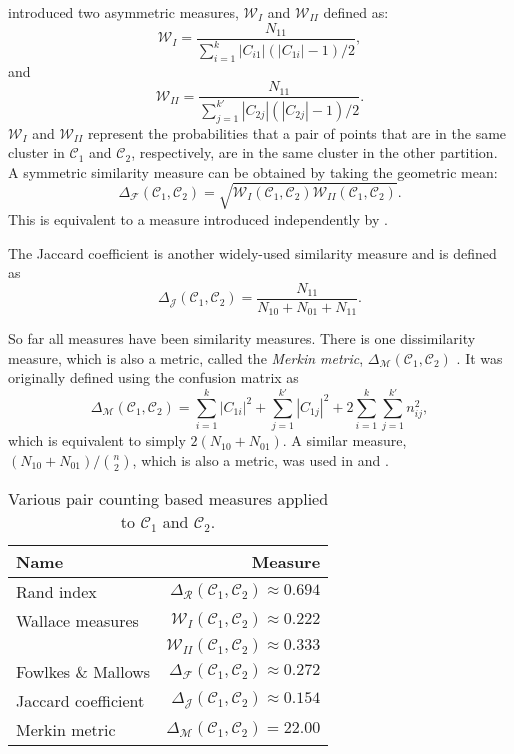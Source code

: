 \documentclass[a4paper]{report}
\newcommand{\clus}{\mathcal{C}}
\newcommand{\partcompare}[1]{\Delta_{\mathcal{#1}}(\clus_1,\clus_2)}
\begin{document}
\citet{wallace-1983} introduced two asymmetric measures, $\mathcal{W}_{I}$ and
$\mathcal{W}_{II}$ defined as:
\begin{equation*}
  \mathcal{W}_{I} = \frac{N_{11}}{\sum_{i=1}^{k} |C_{i1}|(|C_{1i}|-1)/2},
\end{equation*}
and
\begin{equation*}
  \mathcal{W}_{II} = \frac{N_{11}}{\sum_{j=1}^{k'} |C_{2j}|(|C_{2j}|-1)/2}.
\end{equation*}
$\mathcal{W}_{I}$ and $\mathcal{W}_{II}$ represent the probabilities that a
pair of points that are in the same cluster in $\clus_1$ and $\clus_2$,
respectively, are in the same cluster in the other partition.  A symmetric
similarity measure can be obtained by taking the geometric mean:
\begin{equation*}
  \partcompare{F} = \sqrt{\mathcal{W}_{I}(\clus_1,\clus_2)
                          \mathcal{W}_{II}(\clus_1,\clus_2)}.
\end{equation*}
This is equivalent to a measure introduced independently by
\citet{fowlkes-mallows-1983}.

The Jaccard coefficient is another widely-used similarity measure and is
defined as
\begin{equation*}
  \partcompare{J} = \frac{N_{11}}{N_{10}+N_{01}+N_{11}}.
\end{equation*}

So far all measures have been similarity measures.  There is one dissimilarity
measure, which is also a metric, called the \textit{Merkin metric},
$\partcompare{M}$ \citep{mirkin1996mathematical}.  It was originally defined
using the confusion matrix as
\begin{equation*}
  \partcompare{M} = \sum_{i=1}^{k} |C_{1i}|^2 +
                    \sum_{j=1}^{k'} |C_{1j}|^2 +
                    2\sum_{i=1}^{k}\sum_{j=1}^{k'} n_{ij}^2,
\end{equation*}
which is equivalent to simply $2(N_{10}+N_{01})$.  A similar measure,
$(N_{10}+N_{01})/\binom{n}{2}$, which is also a metric, was used in
\citet{mirkin1970measurement} and \citet{arabie1973multidimensional}.

\begin{table}
  \centering
  \begin{tabular}{lr}
    \toprule
    Name & Measure \\
    \midrule
    Rand index          & $\partcompare{R} \approx 0.694$ \\
    Wallace measures    & $\mathcal{W}_{I}(\clus_1,\clus_2) \approx 0.222$ \\
                        & $\mathcal{W}_{II}(\clus_1,\clus_2) \approx 0.333$ \\
    Fowlkes \& Mallows  & $\partcompare{F} \approx 0.272$ \\
    Jaccard coefficient & $\partcompare{J} \approx 0.154$ \\
    Merkin metric       & $\partcompare{M} = 22.00$ \\
    \bottomrule
  \end{tabular}
  \caption{Various pair counting based measures applied to $\clus_1$ and $\clus_2$.}
  \label{tab:pair-counting-comparison}
\end{table}
\end{document}
